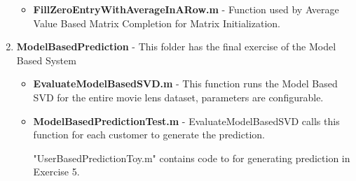 \begin{enumerate}
\begin{itemize}
\item \textbf{FillZeroEntryWithAverageInARow.m} - Function used by Average Value Based Matrix Completion for Matrix Initialization.
\end{itemize}
\item \textbf{ModelBasedPrediction} - This folder has the final exercise of the Model Based System
\begin{itemize}
\item \textbf{EvaluateModelBasedSVD.m} - This function runs the Model Based SVD for the entire movie lens dataset, parameters are configurable.
\item \textbf{ModelBasedPredictionTest.m} - EvaluateModelBasedSVD calls this function for each customer to generate the prediction.


"UserBasedPredictionToy.m" contains code to for generating prediction in Exercise 5.
\end{itemize}
\end{enumerate}
